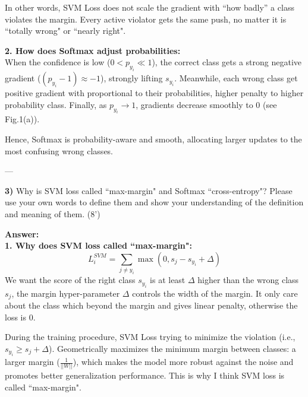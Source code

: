 \documentclass[12pt,a4paper]{article}
\begin{document}
	In other words, SVM Loss does not scale the gradient with “how badly” a class violates the margin. Every active violator gets the same push, no matter it is ``totally wrong" or ``nearly right".
	
	\textbf{2. How does Softmax adjust probabilities:}\\
	When the confidence is low ($0< p_{y_i}\ll 1$), the correct class gets a strong negative gradient ($(p_{y_i}-1)\approx -1$), strongly lifting $s_{y_i}$. 
	Meanwhile, each wrong class get positive gradient with proportional to their probabilities, higher penalty to higher probability class. Finally, as $p_{y_i}\to 1$, gradients decrease smoothly to 0 (see Fig.1(a)).
	
	Hence, Softmax is probability-aware and smooth, allocating larger updates to the most confusing wrong classes.
	
	---
	
	\textbf{3)}  
	Why is SVM loss called ``max-margin" and Softmax ``cross-entropy"? Please use your own words to define them and show your understanding of the definition and meaning of them. (8')
	
	\textbf{Answer:}\\
	\textbf{1. Why does SVM loss called ``max-margin":}\\
	\begin{equation}
		L_i^{SVM} = \sum_{j\ne y_i} \max (0, s_j - s_{y_i} + \Delta)
	\end{equation}
	We want the score of the right class $s_{y_i}$ is at least $\Delta$ higher than the wrong class $s_j$, the margin hyper-parameter $\Delta$ controls the width of the margin. It only care about the class which beyond the margin and gives linear penalty, otherwise the loss is 0.
	
	During the training procedure, SVM Loss trying to minimize the violation (i.e., $s_{y_i}\ge s_j+\Delta$). Geometrically maximizes the minimum margin between classes: a larger margin ($\frac{1}{||W||}$), which makes the model more robust against the noise and promotes better generalization performance. This is why I think SVM loss is called ``max-margin".
	
\end{document}
